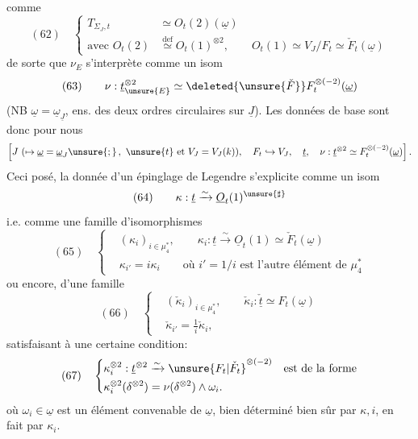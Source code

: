 comme
\[
(62)\quad\left\{\begin{aligned}
T_{\Sigma_J,t}&\simeq O_t(2)(\underline\omega)\\
\text{avec }O_t(2)&\overset{\mathrm{def}}\simeq O_t(1)^{\otimes2},\qquad
O_t(1)\simeq V_J/F_t\simeq\check F_t(\underline\omega)
\end{aligned}\right.
\]
de sorte que $\nu_E$ s'interprète comme un isom
\[
(63)\qquad\nu:\underline t_{\unsure{E}}^{\otimes2}\simeq
\deleted{\unsure{\check F}}F_t^{\otimes(-2)}(\underline\omega)
\]
(NB $\underline\omega=\underline\omega_{\underline J}$, ens. des deux ordres circulaires
sur $\underline J$). Les données de base sont donc
pour nous
\[
\left[J\ (\mapsto\underline\omega=\underline\omega_J\unsure{;}\,,\ \unsure{t}\text{ et }V_J=V_J(k)),\quad
F_t\hookrightarrow V_J,\quad\underline t,\quad
\nu:\underline t^{\otimes2}\simeq F_t^{\otimes(-2)}(\underline\omega)\right].
\]
Ceci posé, la donnée d'un épinglage de
Legendre s'explicite comme un isom
\[
(64)\qquad\kappa:\underline t\xrightarrow{\sim}\underline O_t(1)^{\unsure{\sharp}}
\]
i.e. comme une famille d'isomorphismes
\[
(65)\quad\left\{\begin{aligned}
&(\kappa_i)_{i\in\mu_4^*},\qquad\kappa_i:\underline t\xrightarrow{\sim}\underline O_t(1)\simeq\check F_t(\underline\omega)\\
&\kappa_{i'}=i\kappa_i\qquad\text{où }i'=1/i\text{ est l'autre élément de }\mu_4^*
\end{aligned}\right.
\]
ou encore, d'une famille
\[
(66)\quad\left\{\begin{aligned}
&(\check\kappa_i)_{i\in\mu_4^*},\qquad\check\kappa_i:\check{\underline t}\simeq F_t(\underline\omega)\\
&\check\kappa_{i'}=\frac1i\check\kappa_i,
\end{aligned}\right.
\]
satisfaisant à une certaine condition:
\[
(67)\quad\left\{\begin{aligned}
&\kappa_i^{\otimes2}:\underline t^{\otimes2}\xrightarrow{\sim}\unsure{F_t|\check F_t}^{\otimes(-2)}\quad\text{est de la forme}\\
&\kappa_i^{\otimes2}(\delta^{\otimes2})=\nu(\delta^{\otimes2})\wedge\omega_i.
\end{aligned}\right.
\]
où $\omega_i\in\underline\omega$ est un élément convenable de $\underline\omega$,
bien déterminé bien sûr par $\kappa,i$, en fait par $\kappa_i$.

